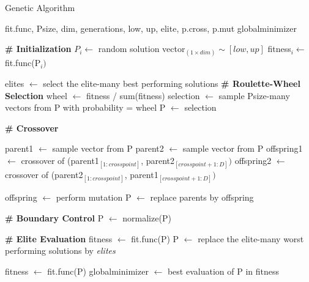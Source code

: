 \begin{algorithm}
\singlespacing
\caption{Genetic Algorithm} \label{GA}
\begin{algorithmic}[1]
	\INPUT fit.func, Psize, dim, generations, low, up, elite, p.cross, p.mut
	\OUTPUT globalminimizer
	
	\noindent \Statex \hrulefill
	\Statex \textbf{\# Initialization}
	\State $P_i \gets $ random solution vector$_{(1 \times dim)} \sim [low, up] $
	\State fitness$_i \gets $ fit.func(P$_i)$ \EndFor
	\Statex
	
	\State elites $\gets$ select the elite-many best performing solutions
	\Statex \textbf{\# Roulette-Wheel Selection}
	\State wheel $\gets$ fitness / sum(fitness)
	\State selection $\gets$ sample Psize-many vectors from P with probability = wheel
	\State P $\gets$ selection
	
	\Statex \textbf{\# Crossover}
	
	\State parent1 $\gets$ sample vector from P
	\State parent2 $\gets$ sample vector from P
	\State offspring1 $\gets$ crossover of (parent1$_{[1:crosspoint]}$, parent2$_{[crosspoint+1:D]})$
	\State offspring2 $\gets$ crossover of (parent2$_{[1:crosspoint]}$, parent1$_{[crosspoint+1:D]})$ \EndIf 
	
	\State offspring $ \gets$ perform mutation \EndIf
	\State P $\gets$ replace parents by offspring
	\EndFor
	
	\Statex \textbf{\# Boundary Control}
	\State P $\gets$ normalize(P)

	
	\Statex \textbf{\# Elite Evaluation}
	\State fitness $\gets$ fit.func(P) 
	\State P $\gets$ replace the elite-many worst performing solutions by \textit{elites}
	
	\State fitness $\gets$ fit.func(P)
	\State globalminimizer $\gets$ best evaluation of P in fitness
	\EndFor

\end{algorithmic}
\end{algorithm}

